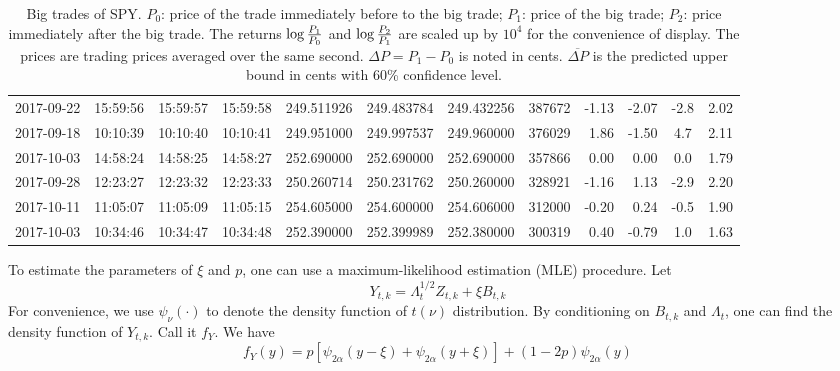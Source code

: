 \begin{table}[htb!]
\begin{tiny}
\begin{tabular}{|c|c|c|c|c|c|c|r|r|r|c|c|}
      2017-09-22 & 15:59:56 & 15:59:57 & 15:59:58 & 249.511926 & 249.483784 & 249.432256 & 387672 & -1.13 & -2.07 & -2.8 & 2.02\\
      2017-09-18 & 10:10:39 & 10:10:40 & 10:10:41 & 249.951000 & 249.997537 & 249.960000 & 376029 & 1.86 & -1.50 & 4.7 & 2.11\\
      2017-10-03 & 14:58:24 & 14:58:25 & 14:58:27 & 252.690000 & 252.690000 & 252.690000 & 357866 & 0.00 & 0.00 & 0.0 & 1.79\\
      2017-09-28 & 12:23:27 & 12:23:32 & 12:23:33 & 250.260714 & 250.231762 & 250.260000 & 328921 & -1.16 & 1.13 & -2.9 & 2.20\\
      2017-10-11 & 11:05:07 & 11:05:09 & 11:05:15 & 254.605000 & 254.600000 & 254.606000 & 312000 & -0.20 & 0.24 & -0.5 & 1.90\\
      2017-10-03 & 10:34:46 & 10:34:47 & 10:34:48 & 252.390000 & 252.399989 & 252.380000 & 300319 & 0.40 & -0.79 & 1.0 & 1.63\\
      \hline
    \end{tabular}
    \caption{\scriptsize Big trades of SPY. $P_0$: price of the trade immediately before to the big trade;
      $P_1$: price of the big trade; $P_2$: price immediately after the big trade.
      The returns $\log {P_1 \over P_0}$ and $\log {P_2 \over P_1}$ are scaled up by $10^4$ for the convenience of
      display. The prices are trading prices averaged over the same second. $\Delta P = P_1 - P_0$ is noted in cents.
      $\overline{\Delta P}$ is the predicted upper bound in cents with 60\% confidence level.
    }
    \label{tab:spy_big_trades}
  \end{tiny}
\end{table}
To estimate the parameters of $\xi$ and $p$, one can use a maximum-likelihood estimation
(MLE) procedure. Let 
\[
  Y_{t, k} = \Lambda_t^{1/2}  Z_{t, k} + \xi B_{t, k}
\]
For convenience, we use $\psi_{\nu}(\cdot)$ to denote the density function of $t(\nu)$ distribution. By conditioning
on $B_{t,k}$ and $\Lambda_t$, one can find the density function of $Y_{t,k}$. Call it $f_Y$. We have
\begin{equation}
  \label{eq:tghjporf}
  f_Y(y) = p [\psi_{2\alpha}(y - \xi) + \psi_{2\alpha}(y + \xi)] + (1 - 2p) \psi_{2\alpha}(y)  
\end{equation}


